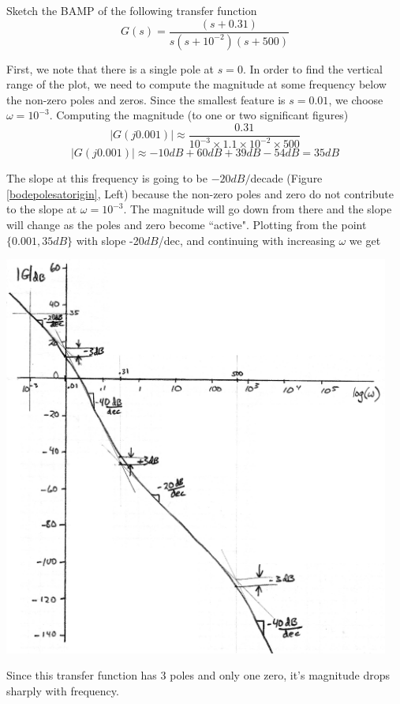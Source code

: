 \begin{Example}
Sketch the BAMP of the following transfer function
\[
G(s) = \frac      {(s+0.31)}       {s(s+10^{-2})(s+500)}
\]

First, we note that there is a single pole at $s=0$.    In order to find the vertical range of the plot, we need to compute the magnitude at some frequency below the non-zero poles and zeros.   Since the smallest feature is $s=0.01$, we choose $\omega=10^{-3}$.  Computing the magnitude  (to one or two significant figures)
\[
|G(j0.001)| \approx  \frac   {0.31}    {10^{-3}\times1.1\times10^{-2}\times500}
\]
\[
|G(j0.001)| \approx  {-10dB} + 60dB + 39dB - 54dB = 35dB
\]

The slope at this frequency is going to be $-20dB/$decade (Figure \ref{bodepolesatorigin}, Left) because the non-zero poles and zero do not contribute to the slope at $\omega = 10^{-3}$.    The magnitude will go down from there and the slope will change as the poles and zero become ``active".   Plotting from the point $\{0.001, 35dB\}$ with slope -20$dB$/dec, and continuing with increasing $\omega$ we get

\includegraphics[width=5.0in]{figs05/00966.png}

Since this transfer function has 3 poles and only one zero, it's magnitude drops sharply with frequency.

\end{Example}



